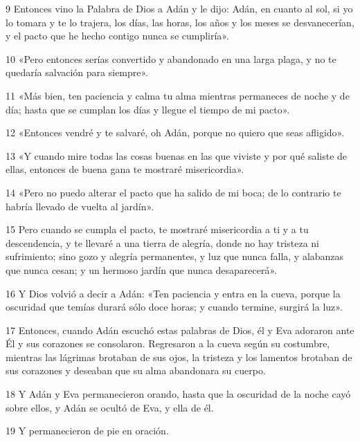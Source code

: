 \par 9 Entonces vino la Palabra de Dios a Adán y le dijo: Adán, en cuanto al sol, si yo lo tomara y te lo trajera, los días, las horas, los años y los meses se desvanecerían, y el pacto que he hecho contigo nunca se cumpliría».

\par 10 «Pero entonces serías convertido y abandonado en una larga plaga, y no te quedaría salvación para siempre».

\par 11 «Más bien, ten paciencia y calma tu alma mientras permaneces de noche y de día; hasta que se cumplan los días y llegue el tiempo de mi pacto».

\par 12 «Entonces vendré y te salvaré, oh Adán, porque no quiero que seas afligido».

\par 13 «Y cuando mire todas las cosas buenas en las que viviste y por qué saliste de ellas, entonces de buena gana te mostraré misericordia».

\par 14 «Pero no puedo alterar el pacto que ha salido de mi boca; de lo contrario te habría llevado de vuelta al jardín».

\par 15 Pero cuando se cumpla el pacto, te mostraré misericordia a ti y a tu descendencia, y te llevaré a una tierra de alegría, donde no hay tristeza ni sufrimiento; sino gozo y alegría permanentes, y luz que nunca falla, y alabanzas que nunca cesan; y un hermoso jardín que nunca desaparecerá».

\par 16 Y Dios volvió a decir a Adán: «Ten paciencia y entra en la cueva, porque la oscuridad que temías durará sólo doce horas; y cuando termine, surgirá la luz».

\par 17 Entonces, cuando Adán escuchó estas palabras de Dios, él y Eva adoraron ante Él y sus corazones se consolaron. Regresaron a la cueva según su costumbre, mientras las lágrimas brotaban de sus ojos, la tristeza y los lamentos brotaban de sus corazones y deseaban que su alma abandonara su cuerpo.

\par 18 Y Adán y Eva permanecieron orando, hasta que la oscuridad de la noche cayó sobre ellos, y Adán se ocultó de Eva, y ella de él.

\par 19 Y permanecieron de pie en oración.

